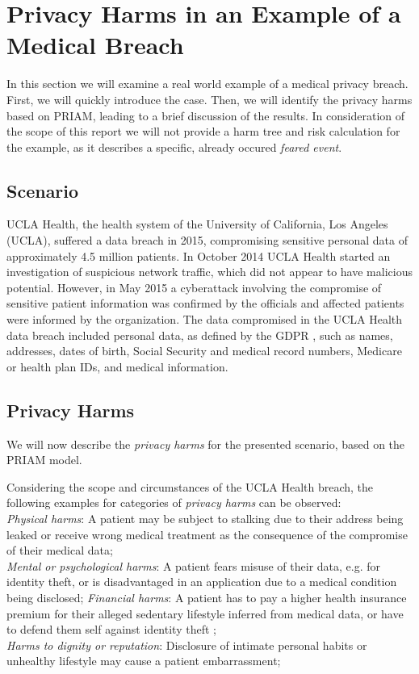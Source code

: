 \section{Privacy Harms in an Example of a Medical Breach}
In this section we will examine a real world example of a medical privacy breach. First, we will quickly introduce the case. Then, we will identify the privacy harms based on PRIAM, leading to a brief discussion of the results.  In consideration of the scope of this report we will not provide a harm tree and risk calculation for the example, as it describes a specific, already occured \textit{feared event}.

\subsection{Scenario}
UCLA Health, the health system of the University of California, Los Angeles (UCLA), suffered a data breach in 2015, compromising sensitive personal data of approximately 4.5 million patients. In October 2014 UCLA Health started an investigation of suspicious network traffic, which did not appear to have malicious potential. However, in May 2015 a cyberattack involving the compromise of sensitive patient information was confirmed by the officials and affected patients were informed by the organization. The data compromised in the UCLA Health data breach included personal data, as defined by the GDPR \cite[Article 4(1)]{gdpr}, such as names, addresses, dates of birth, Social Security and medical record numbers, Medicare or health plan IDs, and medical information.\cite{uclahealthbreach}

\subsection{Privacy Harms}
We will now describe the \textit{privacy harms} for the presented scenario, based on the PRIAM model\cite[Section 3.7]{de:hal-01302541}.

Considering the scope and circumstances of the UCLA Health breach, the following examples for categories of \textit{privacy harms} can be observed:\\
\textit{Physical harms}: A patient may be subject to stalking due to their address being leaked or receive wrong medical treatment as the consequence of the compromise of their medical data;\\
\textit{Mental or psychological harms}: A patient fears misuse of their data, e.g. for identity theft, or is disadvantaged in an application due to a medical condition being disclosed;
\textit{Financial harms}: A patient has to pay a higher health insurance premium for their alleged sedentary lifestyle inferred from medical data, or have to defend them self against identity theft ;\\
\textit{Harms to dignity or reputation}: Disclosure of intimate personal habits or unhealthy lifestyle may cause a patient embarrassment;

